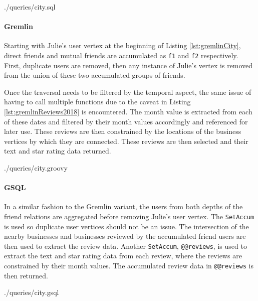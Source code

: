 
{./queries/city.sql}

\paragraph{Gremlin}

Starting with Julie's user vertex at the beginning of Listing \ref{lst:gremlinCity}, direct friends and mutual friends are accumulated as \texttt{f1} and \texttt{f2} respectively. First, duplicate users are removed, then any instance of Julie's vertex is removed from the union of these two accumulated groups of friends.

Once the traversal needs to be filtered by the temporal aspect, the same issue of having to call multiple functions due to the caveat in Listing \ref{lst:gremlinReviews2018} is encountered. The month value is extracted from each of these dates and filtered by their month values accordingly and referenced for later use. These reviews are then constrained by the locations of the business vertices by which they are connected. These reviews are then selected and their text and star rating data returned.


{./queries/city.groovy}

\paragraph{GSQL}

In a similar fashion to the Gremlin variant, the users from both depths of the friend relations are aggregated before removing Julie's user vertex. The \texttt{SetAccum} is used so duplicate user vertices should not be an issue. The intersection of the nearby businesses and businesses reviewed by the accumulated friend users are then used to extract the review data. Another \texttt{SetAccum}, \texttt{@@reviews}, is used to extract the text and star rating data from each review, where the reviews are constrained by their month values. The accumulated review data in \texttt{@@reviews} is then returned.


{./queries/city.gsql}

